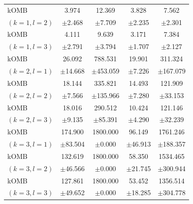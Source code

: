 \begin{tabular}{lcccc}
kOMB
& 3.974 & 12.369 & 3.828 & 7.562 \\
{\scriptsize $(k=1,l=2)$} & {\scriptsize $\pm$2.468} & {\scriptsize $\pm$7.709} & {\scriptsize $\pm$2.235} & {\scriptsize $\pm$2.301} \\

kOMB
& 4.111 & 9.639 & 3.171 & 7.384 \\
{\scriptsize $(k=1,l=3)$} & {\scriptsize $\pm$2.791} & {\scriptsize $\pm$3.794} & {\scriptsize $\pm$1.707} & {\scriptsize $\pm$2.127} \\

kOMB
& 26.092 & 788.531 & 19.901 & 311.324 \\
{\scriptsize $(k=2,l=1)$} & {\scriptsize $\pm$14.668} & {\scriptsize $\pm$453.059} & {\scriptsize $\pm$7.226} & {\scriptsize $\pm$167.079} \\

kOMB
& 18.144 & 335.821 & 14.493 & 121.909 \\
{\scriptsize $(k=2,l=2)$} & {\scriptsize $\pm$7.566} & {\scriptsize $\pm$135.966} & {\scriptsize $\pm$7.280} & {\scriptsize $\pm$33.153} \\

kOMB
& 18.016 & 290.512 & 10.424 & 121.146 \\
{\scriptsize $(k=2,l=3)$} & {\scriptsize $\pm$9.135} & {\scriptsize $\pm$85.391} & {\scriptsize $\pm$4.290} & {\scriptsize $\pm$32.239} \\

kOMB
& 174.900 & 1800.000 & 96.149 & 1761.246 \\
{\scriptsize $(k=3,l=1)$} & {\scriptsize $\pm$83.504} & {\scriptsize $\pm$0.000} & {\scriptsize $\pm$46.913} & {\scriptsize $\pm$188.357} \\

kOMB
& 132.619 & 1800.000 & 58.350 & 1534.465 \\
{\scriptsize $(k=3,l=2)$} & {\scriptsize $\pm$46.566} & {\scriptsize $\pm$0.000} & {\scriptsize $\pm$21.745} & {\scriptsize $\pm$300.944} \\

kOMB
& 127.861 & 1800.000 & 53.452 & 1356.514 \\
{\scriptsize $(k=3,l=3)$} & {\scriptsize $\pm$49.652} & {\scriptsize $\pm$0.000} & {\scriptsize $\pm$18.285} & {\scriptsize $\pm$304.778} \\
\bottomrule
\end{tabular}
